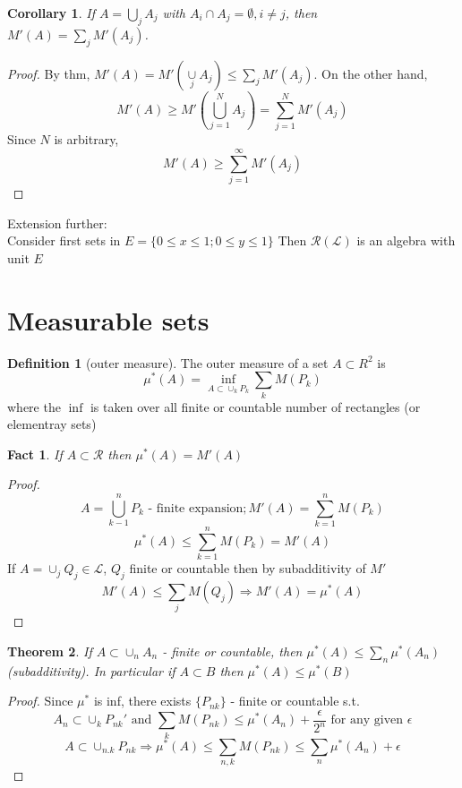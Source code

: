 \documentclass[11pt,a4paper]{report}
\newtheorem{corollary}[theorem]{Corollary}
\theoremstyle{plain}
\newtheorem{thm}{Theorem}[section]
\newtheorem{fact}[thm]{Fact}
\theoremstyle{definition}
\newtheorem*{defn}{Definition}
\theoremstyle{remark}
\newcommand{\intersection}{\cap}
\newcommand{\Union}{\bigcup}
\newcommand{\cL}{\mathcal{L}}
\newcommand{\cR}{\mathcal{R}}
\begin{document}
\begin{corollary}
 If $A = \Union_j A_j$ with $A_i \intersection A_j = \emptyset, i \ne j$, then $M'(A) = \sum_j M'(A_j)$.    
\end{corollary}

\begin{proof}
  By thm, $M'(A) = M'(\underset{j}{\cup} A_j) \leq \sum_j M'(A_j)$.
  On the other hand, 
  \[ M'(A) \geq M'(\bigcup_{j=1}^N A_j) = \sum_{j=1}^N M'(A_j) \]
  Since $N$ is arbitrary,
  \[ M'(A) \geq \sum_{j=1}^\infty M'(A_j) \]
\end{proof}

Extension further:\\
Consider first sets in $E = \{ 0 \leq x \leq 1; 0 \leq y \leq 1 \}$
Then $\cR(\cL)$ is an algebra with unit $E$

\section{Measurable sets}

\begin{defn}[outer measure]
  The outer measure of a set $A \subset R^2$ is
  \[ \mu^*(A) = \inf_{A\subset \cup_k P_k} \sum_k M(P_k) \]
  where the $\inf$ is taken over all finite or countable number of rectangles (or elementray sets)
\end{defn}

\begin{fact}
  If $A \subset \cR$ then $\mu^*(A) = M'(A)$
\end{fact}

\begin{proof}
  \[ A = \bigcup_{k-1}^n P_k \text{ - finite expansion}; M'(A) = \sum_{k=1}^n M(P_k) \]
  \[ \mu^*(A) \leq \sum_{k=1}^n M(P_k) = M'(A) \]
  If $A = \cup_j Q_j \in \cL$, $Q_j$ finite or countable
  then by subadditivity of $M'$
  \[ M'(A) \leq \sum_j M(Q_j) \Rightarrow M'(A) = \mu^*(A) \]
\end{proof}

\begin{thm}
  If $A \subset \cup_n A_n$ - finite or countable, then $\mu^*(A) \leq \sum_n \mu^*(A_n)$ (subadditivity).
  In particular if $A \subset B$ then $\mu^*(A) \leq \mu^*(B)$
\end{thm}

\begin{proof}
  Since $\mu^*$ is inf, there exists $\{ P_{nk} \}$ - finite or countable s.t.
  \[ A_n \subset \cup_k P_{nk}' \text{ and } \sum_k M(P_{nk}) \leq \mu^*(A_n) + \frac{\epsilon}{2^n} \text{ for any given } \epsilon \]
  \[ A \subset \cup_{n.k} P_{nk} \Rightarrow \mu^*(A) \leq \sum_{n,k} M(P_{nk}) \leq \sum_n \mu^*(A_n) + \epsilon \]
\end{proof}
\end{document}
